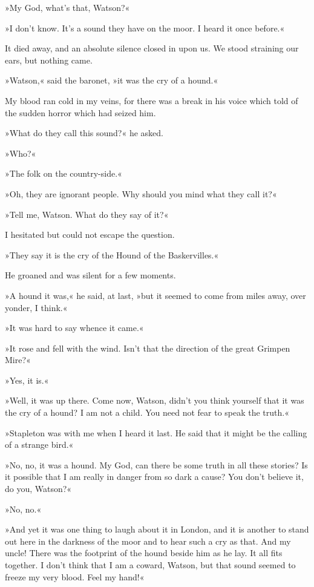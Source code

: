 »My God, what's that, Watson?«

»I don't know. It's a sound they have on the moor. I heard it once before.«

It died away, and an absolute silence closed in upon us. We stood straining our ears, but nothing came.

»Watson,« said the baronet, »it was the cry of a hound.«

My blood ran cold in my veins, for there was a break in his voice which told of the sudden horror which had seized him.

»What do they call this sound?« he asked.

»Who?«

»The folk on the country-side.«

»Oh, they are ignorant people. Why should you mind what they call it?«

»Tell me, Watson. What do they say of it?«

I hesitated but could not escape the question.

»They say it is the cry of the Hound of the Baskervilles.«

He groaned and was silent for a few moments.

»A hound it was,« he said, at last, »but it seemed to come from miles away, over yonder, I think.«

»It was hard to say whence it came.«

»It rose and fell with the wind. Isn't that the direction of the great Grimpen Mire?«

»Yes, it is.«

»Well, it was up there. Come now, Watson, didn't you think yourself that it was the cry of a hound? I am not a child. You need not fear to speak the truth.«

»Stapleton was with me when I heard it last. He said that it might be the calling of a strange bird.«

»No, no, it was a hound. My God, can there be some truth in all these stories? Is it possible that I am really in danger from so dark a cause? You don't believe it, do you, Watson?«

»No, no.«

»And yet it was one thing to laugh about it in London, and it is another to stand out here in the darkness of the moor and to hear such a cry as that. And my uncle! There was the footprint of the hound beside him as he lay. It all fits together. I don't think that I am a coward, Watson, but that sound seemed to freeze my very blood. Feel my hand!«

